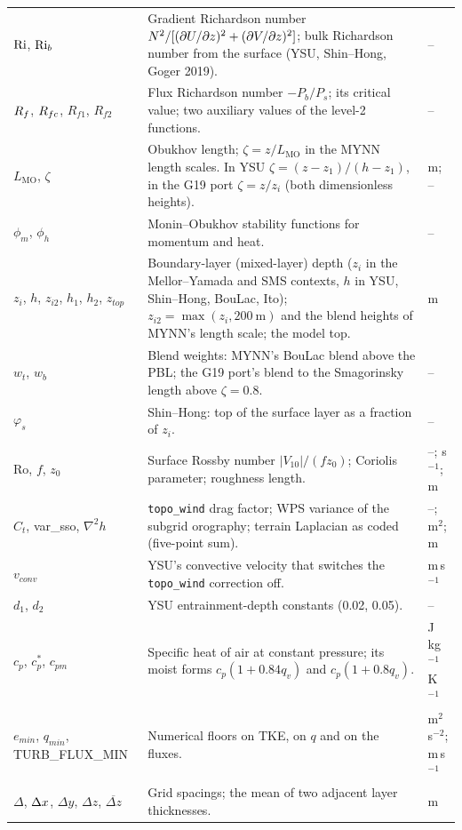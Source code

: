 \begin{xltabular}{\linewidth}{@{}>{\raggedright\arraybackslash}p{3.6cm} >{\raggedright\arraybackslash}X >{\raggedright\arraybackslash}p{2.3cm}@{}}
$\mathrm{Ri}$, $\mathrm{Ri}_b$ & Gradient Richardson number $N^2/[(\partial U/\partial z)^2 + (\partial V/\partial z)^2]$; bulk Richardson number from the surface (YSU, Shin--Hong, Goger 2019). & -- \\
$R_f$, $R_{fc}$, $R_{f1}$, $R_{f2}$ & Flux Richardson number $-P_b/P_s$; its critical value; two auxiliary values of the level-2 functions. & -- \\
$L_{\mathrm{MO}}$, $\zeta$ & Obukhov length; $\zeta = z/L_{\mathrm{MO}}$ in the MYNN length scales. In YSU $\zeta = (z - z_1)/(h - z_1)$, in the G19 port $\zeta = z/z_i$ (both dimensionless heights). & m; -- \\
$\phi_m$, $\phi_h$ & Monin--Obukhov stability functions for momentum and heat. & -- \\
$z_i$, $h$, $z_{i2}$, $h_1$, $h_2$, $z_{top}$ & Boundary-layer (mixed-layer) depth ($z_i$ in the Mellor--Yamada and SMS contexts, $h$ in YSU, Shin--Hong, BouLac, Ito); $z_{i2} = \max(z_i, 200~\mathrm{m})$ and the blend heights of MYNN's length scale; the model top. & m \\
$w_t$, $w_b$ & Blend weights: MYNN's BouLac blend above the PBL; the G19 port's blend to the Smagorinsky length above $\zeta = 0.8$. & -- \\
$\varphi_s$ & Shin--Hong: top of the surface layer as a fraction of $z_i$. & -- \\
$\mathrm{Ro}$, $f$, $z_0$ & Surface Rossby number $|V_{10}|/(f z_0)$; Coriolis parameter; roughness length. & --; s$^{-1}$; m \\
$C_t$, var\_sso, $\nabla^2 h$ & \texttt{topo\_wind} drag factor; WPS variance of the subgrid orography; terrain Laplacian as coded (five-point sum). & --; m$^2$; m \\
$v_{conv}$ & YSU's convective velocity that switches the \texttt{topo\_wind} correction off. & m\,s$^{-1}$ \\
$d_1$, $d_2$ & YSU entrainment-depth constants (0.02, 0.05). & -- \\
$c_p$, $c_p^*$, $c_{pm}$ & Specific heat of air at constant pressure; its moist forms $c_p(1 + 0.84 q_v)$ and $c_p(1 + 0.8 q_v)$. & J\,kg$^{-1}$\,K$^{-1}$ \\
$e_{min}$, $q_{min}$, TURB\_FLUX\_MIN & Numerical floors on TKE, on $q$ and on the fluxes. & m$^2$\,s$^{-2}$; m\,s$^{-1}$ \\
$\Delta$, $\Delta x$, $\Delta y$, $\Delta z$, $\overline{\Delta z}$ & Grid spacings; the mean of two adjacent layer thicknesses. & m \\

\end{xltabular}
